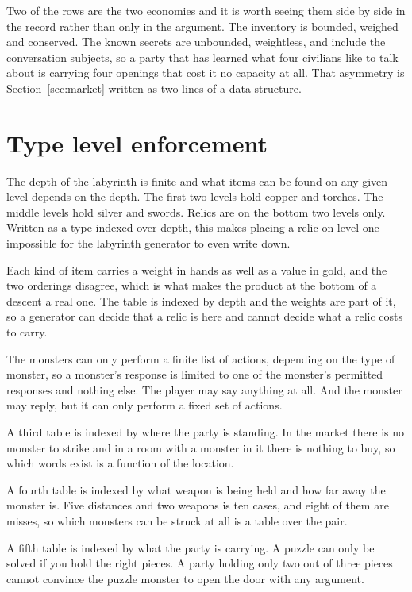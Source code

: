 \documentclass[11pt,a4paper]{article}
\begin{document}
Two of the rows are the two economies and it is worth seeing them side by side in the record rather
than only in the argument. The inventory is bounded, weighed and conserved. The known secrets are
unbounded, weightless, and include the conversation subjects, so a party that has learned what four
civilians like to talk about is carrying four openings that cost it no capacity at all. That
asymmetry is Section~\ref{sec:market} written as two lines of a data structure.

\section{Type level enforcement}
\label{sec:types}

The depth of the labyrinth is finite and what items can be found on any given level depends on
the depth. The first two levels hold copper and torches. The middle levels hold silver and
swords. Relics are on the bottom two levels only. Written as a type indexed over depth, this
makes placing a relic on level one impossible for the labyrinth generator to even write down.

Each kind of item carries a weight in hands as well as a value in gold, and the two orderings
disagree, which is what makes the product at the bottom of a descent a real one. The table is
indexed by depth and the weights are part of it, so a generator can decide that a relic is here
and cannot decide what a relic costs to carry.

The monsters can only perform a finite list of actions, depending on the type of monster, so a
monster's response is limited to one of the monster's permitted responses and nothing else. The
player may say anything at all. And the monster may reply, but it can only perform a fixed set of
actions.

A third table is indexed by where the party is standing. In the market there is no monster to
strike and in a room with a monster in it there is nothing to buy, so which words exist is a
function of the location.

A fourth table is indexed by what weapon is being held and how far away the monster is. Five
distances and two weapons is ten cases, and eight of them are misses, so which monsters can be
struck at all is a table over the pair.

A fifth table is indexed by what the party is carrying. A puzzle can only be solved if you hold
the right pieces. A party holding only two out of three pieces cannot convince the puzzle monster
to open the door with any argument.
\end{document}
